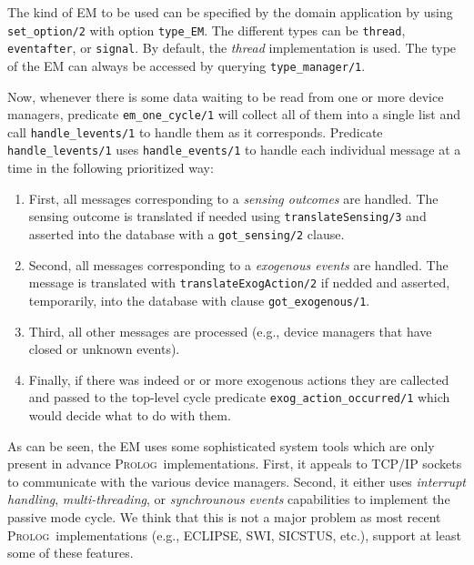 \documentclass[11pt]{article}
\newcommand{\Prolog}{\mbox{\textsc{Prolog}}}
\begin{document}
The kind of EM to be used can be specified by the domain application by using
\texttt{set\_option/2} with option \texttt{type\_EM}. The different types can
be \texttt{thread}, \texttt{eventafter}, or \texttt{signal}. By default, the
\textit{thread} implementation is used.
%
The type of the EM can always be accessed by querying \texttt{type\_manager/1}.

Now, whenever there is some data waiting to be read from one or more device
managers, predicate \texttt{em\_one\_cycle/1} will collect all of them into a
single list and call \texttt{handle\_levents/1} to handle them as it
corresponds. Predicate \texttt{handle\_levents/1} uses
\texttt{handle\_events/1} to handle each individual message at a time in the
following prioritized way:
\begin{enumerate}
\item First, all messages corresponding to a \textit{sensing outcomes} are
handled. The sensing outcome is translated if needed using
\texttt{translateSensing/3} and asserted into the database with a
\texttt{got\_sensing/2} clause.

\item Second, all messages corresponding to a \textit{exogenous events} are
handled. The message is translated with \texttt{translateExogAction/2} if nedded
and asserted, temporarily, into the database with clause
\texttt{got\_exogenous/1}.

\item Third, all other messages are processed (e.g., device
managers that have closed or unknown events). 

\item Finally, if there was indeed or or more exogenous actions they are
callected and passed to the top-level cycle predicate 
\texttt{exog\_action\_occurred/1} which would decide what to do with them.
\end{enumerate}


As can be seen, the EM uses some sophisticated system tools which are only
present in advance \Prolog\ implementations. First, it appeals to TCP/IP
sockets to communicate with the various device managers. Second, it either uses
\textit{interrupt handling}, \textit{multi-threading}, or \textit{synchrounous
events} capabilities to implement the passive mode cycle.
%
We think that this is not a major problem as most recent \Prolog\
implementations
(e.g., ECLIPSE, SWI, SICSTUS, etc.), support at least some of these
features.

\end{document}
